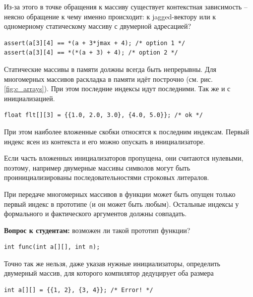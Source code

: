 \documentclass[a4paper,12pt,oneside]{article}
\newif\ifanswers
\begin{document}
Из-за этого в точке обращения к массиву существует контекстная зависимость -- неясно обращение к чему именно происходит: к jagged-вектору или к одномерному статическому массиву с двумерной адресацией?

\begin{lstlisting}
assert(a[3][4] == *(a + 3*jmax + 4); /* option 1 */
assert(a[3][4] == *(*(a + 3) + 4); /* option 2 */
\end{lstlisting}

Статические массивы в памяти должны всегда быть непрерывны. Для многомерных массивов раскладка в памяти идёт построчно (см. рис. \ref{fig:c_arrays}). При этом последние индексы идут последними. Так же и с инициализацией.

\begin{lstlisting}
float flt[][3] = {{1.0, 2.0, 3.0}, {4.0, 5.0}}; /* ok */
\end{lstlisting}

При этом наиболее вложенные скобки относятся к последним индексам. Первый индекс ясен из контекста и его можно опускать в инициализаторе.

Если часть вложенных инициализаторов пропущена, они считаются нулевыми, поэтому, например двумерные массивы символов могут быть проинициализированы последовательностями строковых литералов.

При передаче многомерных массивов в функции может быть опущен только первый индекс в прототипе (и он может быть любым). Остальные индексы у формального и фактического аргументов должны совпадать.

\textbf{Вопрос к студентам:} возможен ли такой прототип функции?

\begin{lstlisting}
int func(int a[][], int n);
\end{lstlisting}

\ifanswers
Правильный ответ: нет, так как у статического массива не могут быть опущены оба индекса. Допустимы следующие варианты:

\begin{lstlisting}
int func(int a[][3], int n);
int func(int (*a)[3], int n);
\end{lstlisting}
\fi

Точно так же нельзя, даже указав нужные инициализаторы, определить двумерный массив, для которого компилятор дедуцирует оба размера

\begin{lstlisting}
int a[][] = {{1, 2}, {3, 4}}; /* Error! */
\end{lstlisting}
\end{document}
